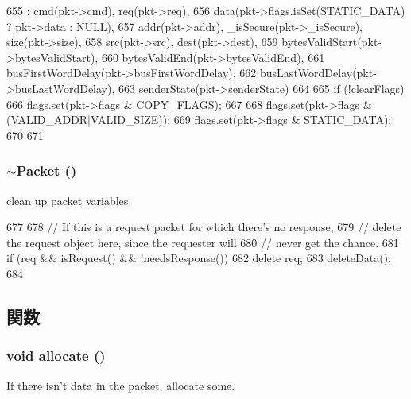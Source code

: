 \begin{DoxyCode}
655         :  cmd(pkt->cmd), req(pkt->req),
656            data(pkt->flags.isSet(STATIC_DATA) ? pkt->data : NULL),
657            addr(pkt->addr), _isSecure(pkt->_isSecure), size(pkt->size),
658            src(pkt->src), dest(pkt->dest),
659            bytesValidStart(pkt->bytesValidStart),
660            bytesValidEnd(pkt->bytesValidEnd),
661            busFirstWordDelay(pkt->busFirstWordDelay),
662            busLastWordDelay(pkt->busLastWordDelay),
663            senderState(pkt->senderState)
664     {
665         if (!clearFlags)
666             flags.set(pkt->flags & COPY_FLAGS);
667 
668         flags.set(pkt->flags & (VALID_ADDR|VALID_SIZE));
669         flags.set(pkt->flags & STATIC_DATA);
670 
671     }
\end{DoxyCode}
\hypertarget{classPacket_a39d19f9b1d6f6c2028a930cdfcdff809}{
\subsubsection[{$\sim$Packet}]{\setlength{\rightskip}{0pt plus 5cm}$\sim${\bf Packet} ()}}
\label{classPacket_a39d19f9b1d6f6c2028a930cdfcdff809}
clean up packet variables 


\begin{DoxyCode}
677     {
678         // If this is a request packet for which there's no response,
679         // delete the request object here, since the requester will
680         // never get the chance.
681         if (req && isRequest() && !needsResponse())
682             delete req;
683         deleteData();
684     }
\end{DoxyCode}


\subsection{関数}
\hypertarget{classPacket_acaefe811b78a2fdc4a0dba0c4029c3ef}{
\subsubsection[{allocate}]{\setlength{\rightskip}{0pt plus 5cm}void allocate ()}}
\label{classPacket_acaefe811b78a2fdc4a0dba0c4029c3ef}
If there isn't data in the packet, allocate some. 


